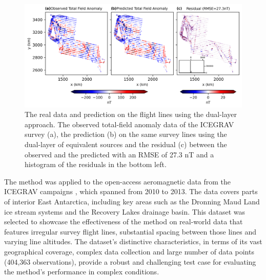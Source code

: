 \begin{figure}[tb!]
\centering
\includegraphics[width=1\linewidth]{figures/real_line_pred.png}
\caption{
    The real data and prediction on the flight lines using the dual-layer approach. The observed total-field anomaly data of the ICEGRAV survey \citep{ICEGRAV_data} (a), the prediction (b) on the same survey lines using the dual-layer of equivalent sources and the residual (c) between the observed and the predicted with an RMSE of 27.3 nT and a histogram of the residuals in the bottom left.
}
\label{fig:real_line_pred}
\end{figure}

The method was applied to the open-access aeromagnetic data from the ICEGRAV campaigns \citep{ICEGRAV_data}, which spanned from 2010 to 2013. The data covers parts of interior East Antarctica, including key areas such as the Dronning Maud Land ice stream systems and the Recovery Lakes drainage basin. This dataset was selected to showcase the effectiveness of the method on real-world data that features irregular survey flight lines, substantial spacing between those lines and varying line altitudes. The dataset’s distinctive characteristics, in terms of its vast geographical coverage, complex data collection and large number of data points (404,363 observations), provide a robust and challenging test case for evaluating the method's performance in complex conditions.

